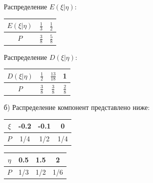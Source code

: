 \begin{enumerate}
	Распределение $E(\xi | \eta)$:
	\begin{table}[H]
		\centering\makegapedcells
		\begin{tabular}{|c|c|c|}
			\hline
			$E(\xi | \eta)$ & $\frac{1}{3}$ & $\frac{1}{2}$ \\ \hline
			$P$             & $\frac{3}{8}$ & $\frac{5}{8}$ \\ \hline
		\end{tabular}
	\end{table}
	
	Распределение $D(\xi | \eta)$:
	\begin{table}[H]
		\centering\makegapedcells
		\begin{tabular}{|c|c|c|c|}
			\hline
			$D(\xi | \eta)$ & $\frac{1}{2}$ & $\frac{13}{18}$ & 1             \\ \hline
			$P$             & $\frac{3}{8}$ & $\frac{3}{8}$   & $\frac{2}{8}$ \\ \hline
		\end{tabular}
	\end{table}

	\item[б)] Распределение компонент представлено ниже:
	\begin{table}[H]
		\centering
		\begin{tabular}{|c|c|c|c|}
			\hline
			$\xi$ & -0.2 & -0.1 & 0   \\ \hline
			$P$   & 1/4  & 1/2  & 1/4 \\ \hline
		\end{tabular}
	\end{table}
	\begin{table}[H]
		\centering
		\begin{tabular}{|c|c|c|c|}
			\hline
			$\eta$ & 0.5 & 1.5 & 2   \\ \hline
			$P$    & 1/3 & 1/2 & 1/6 \\ \hline
		\end{tabular}
	\end{table}


\end{enumerate}
